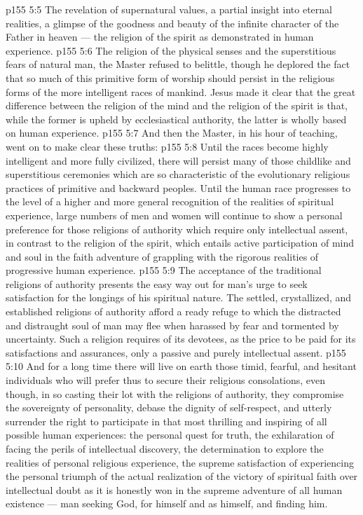 \vs p155 5:5 \bibnobreakspace {} The revelation of supernatural values, a partial insight into eternal realities, a glimpse of the goodness and beauty of the infinite character of the Father in heaven --- the religion of the spirit as demonstrated in human experience.
\vs p155 5:6 \pc The religion of the physical senses and the superstitious fears of natural man, the Master refused to belittle, though he deplored the fact that so much of this primitive form of worship should persist in the religious forms of the more intelligent races of mankind. Jesus made it clear that the great difference between the religion of the mind and the religion of the spirit is that, while the former is upheld by ecclesiastical authority, the latter is wholly based on human experience.
\vs p155 5:7 \pc And then the Master, in his hour of teaching, went on to make clear these truths:
\vs p155 5:8 \pc Until the races become highly intelligent and more fully civilized, there will persist many of those childlike and superstitious ceremonies which are so characteristic of the evolutionary religious practices of primitive and backward peoples. Until the human race progresses to the level of a higher and more general recognition of the realities of spiritual experience, large numbers of men and women will continue to show a personal preference for those religions of authority which require only intellectual assent, in contrast to the religion of the spirit, which entails active participation of mind and soul in the faith adventure of grappling with the rigorous realities of progressive human experience.
\vs p155 5:9 The acceptance of the traditional religions of authority presents the easy way out for man’s urge to seek satisfaction for the longings of his spiritual nature. The settled, crystallized, and established religions of authority afford a ready refuge to which the distracted and distraught soul of man may flee when harassed by fear and tormented by uncertainty. Such a religion requires of its devotees, as the price to be paid for its satisfactions and assurances, only a passive and purely intellectual assent.
\vs p155 5:10 And for a long time there will live on earth those timid, fearful, and hesitant individuals who will prefer thus to secure their religious consolations, even though, in so casting their lot with the religions of authority, they compromise the sovereignty of personality, debase the dignity of self\hyp{}respect, and utterly surrender the right to participate in that most thrilling and inspiring of all possible human experiences: the personal quest for truth, the exhilaration of facing the perils of intellectual discovery, the determination to explore the realities of personal religious experience, the supreme satisfaction of experiencing the personal triumph of the actual realization of the victory of spiritual faith over intellectual doubt as it is honestly won in the supreme adventure of all human existence --- man seeking God, for himself and as himself, and finding him.
